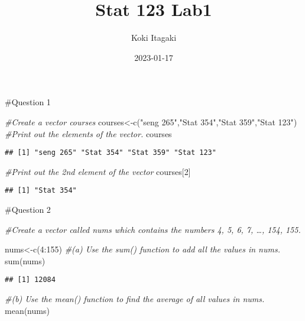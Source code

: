 \documentclass[
]{article}
\title{Stat 123 Lab1}
\author{Koki Itagaki}
\date{2023-01-17}
\newenvironment{Shaded}{\begin{snugshade}}{\end{snugshade}}
\newcommand{\CommentTok}[1]{\textcolor[rgb]{0.56,0.35,0.01}{\textit{#1}}}
\newcommand{\DecValTok}[1]{\textcolor[rgb]{0.00,0.00,0.81}{#1}}
\newcommand{\FunctionTok}[1]{\textcolor[rgb]{0.00,0.00,0.00}{#1}}
\newcommand{\NormalTok}[1]{#1}
\newcommand{\OtherTok}[1]{\textcolor[rgb]{0.56,0.35,0.01}{#1}}
\newcommand{\SpecialCharTok}[1]{\textcolor[rgb]{0.00,0.00,0.00}{#1}}
\newcommand{\StringTok}[1]{\textcolor[rgb]{0.31,0.60,0.02}{#1}}
\begin{document}
\maketitle

\#Question 1

\begin{Shaded}
\begin{Highlighting}[]
\CommentTok{\#Create a vector courses}
\NormalTok{courses}\OtherTok{\textless{}{-}}\FunctionTok{c}\NormalTok{(}\StringTok{"seng 265"}\NormalTok{,}\StringTok{"Stat 354"}\NormalTok{,}\StringTok{"Stat 359"}\NormalTok{,}\StringTok{"Stat 123"}\NormalTok{)}
\CommentTok{\#Print out the elements of the vector.}
\NormalTok{courses}
\end{Highlighting}
\end{Shaded}

\begin{verbatim}
## [1] "seng 265" "Stat 354" "Stat 359" "Stat 123"
\end{verbatim}

\begin{Shaded}
\begin{Highlighting}[]
\CommentTok{\#Print out the 2nd element of the vector}
\NormalTok{courses[}\DecValTok{2}\NormalTok{]}
\end{Highlighting}
\end{Shaded}

\begin{verbatim}
## [1] "Stat 354"
\end{verbatim}

\#Question 2

\begin{Shaded}
\begin{Highlighting}[]
\CommentTok{\#Create a vector called nums which contains the numbers 4, 5, 6, 7, …, 154, 155.}

\NormalTok{nums}\OtherTok{\textless{}{-}}\FunctionTok{c}\NormalTok{(}\DecValTok{4}\SpecialCharTok{:}\DecValTok{155}\NormalTok{)}
\CommentTok{\#(a) Use the sum() function to add all the values in nums.}
\FunctionTok{sum}\NormalTok{(nums)}
\end{Highlighting}
\end{Shaded}

\begin{verbatim}
## [1] 12084
\end{verbatim}

\begin{Shaded}
\begin{Highlighting}[]
\CommentTok{\#(b) Use the mean() function to find the average of all values in nums.}
\FunctionTok{mean}\NormalTok{(nums)}
\end{Highlighting}
\end{Shaded}
\end{document}
